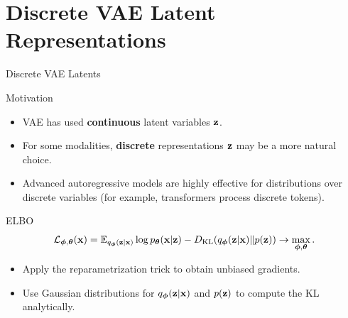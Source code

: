 \documentclass{beamer}
\begin{document}
\section{Discrete VAE Latent Representations}
\begin{frame}{Discrete VAE Latents}
	\begin{block}{Motivation}
		\begin{itemize}
			\item VAE has used \textbf{continuous} latent variables $\mathbf{z}$.
			\item For some modalities, \textbf{discrete} representations $\mathbf{z}$ may be a more natural choice.
			\item Advanced autoregressive models are highly effective for distributions over discrete variables (for example, transformers process discrete tokens).
		\end{itemize}
	\end{block}
	\eqpause
	\begin{block}{ELBO}
		\vspace{-0.3cm}
		\[
			\mathcal{L}_{\boldsymbol{\phi}, \boldsymbol{\theta}}(\mathbf{x})  = \mathbb{E}_{q_{\boldsymbol{\phi}}(\mathbf{z}| \mathbf{x})} \log p_{\boldsymbol{\theta}}(\mathbf{x}| \mathbf{z}) - D_\mathrm{KL}(q_{\boldsymbol{\phi}}(\mathbf{z}| \mathbf{x}) \| p(\mathbf{z})) \rightarrow \max_{\boldsymbol{\phi}, \boldsymbol{\theta}}.
		\]
		\vspace{-0.5cm}
	\end{block}
	\eqpause
	\begin{itemize}
		\item Apply the reparametrization trick to obtain unbiased gradients.
		\item Use Gaussian distributions for $q_{\boldsymbol{\phi}}(\mathbf{z}| \mathbf{x})$ and $p(\mathbf{z})$ to compute the KL analytically.
	\end{itemize}
\end{frame}
\end{document}
